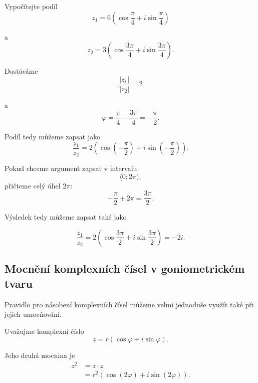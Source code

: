 \documentclass[12pt,a4paper]{article}
\begin{document}
\begin{examplebox}
    Vypočítejte podíl
    \[
        z_1 = 6 \left(
                    \cos\frac{\pi}{4}
                    +
                    i\sin\frac{\pi}{4}
                \right)
    \]

    a
    \[
        z_2 = 3 \left(
                    \cos\frac{3\pi}{4}
                    +
                    i\sin\frac{3\pi}{4}
                \right).
    \]

    Dostáváme
    \[
        \frac{|z_1|}{|z_2|} = 2
    \]

    a
    \[
        \varphi = \frac{\pi}{4} - \frac{3\pi}{4} = -\frac{\pi}{2}.
    \]

    Podíl tedy můžeme zapsat jako
    \[
        \frac{z_1}{z_2} = 2 \left(
                                \cos\left(-\frac{\pi}{2}\right)
                                +
                                i\sin\left(-\frac{\pi}{2}\right)
                            \right).
    \]

    Pokud chceme argument zapsat v intervalu
    \[
        \langle0;2\pi),
    \]
    přičteme celý úhel $2\pi$:
    \[
        -\frac{\pi}{2}+2\pi = \frac{3\pi}{2}.
    \]

    Výsledek tedy můžeme zapsat také jako

    \[
        \frac{z_1}{z_2} = 2 \left(
                                \cos\frac{3\pi}{2}
                                +
                                i\sin\frac{3\pi}{2}
                            \right)
                        = -2i.
    \]
\end{examplebox}


\subsection{Mocnění komplexních čísel v goniometrickém tvaru}
Pravidlo pro násobení komplexních čísel můžeme velmi jednoduše využít
také při jejich umocňování.

Uvažujme komplexní číslo
\[
    z = r   \left(
                \cos\varphi + i\sin\varphi
            \right).
\]

Jeho druhá mocnina je
\begin{align*}
    z^2 &= z\cdot z \\
        &= r^2  \left(
                    \cos(2\varphi) + i\sin(2\varphi)
                \right).
\end{align*}
\end{document}
